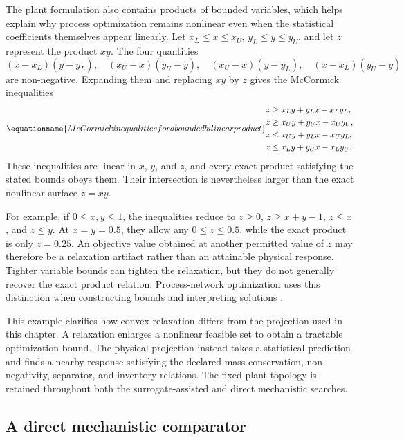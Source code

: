 The plant formulation also contains products of bounded variables, which helps explain why process optimization remains nonlinear even when the statistical coefficients themselves appear linearly. Let $x_L\leq x\leq x_U$, $y_L\leq y\leq y_U$, and let $z$ represent the product $xy$. The four quantities
\[
(x-x_L)(y-y_L),\quad (x_U-x)(y_U-y),\quad
(x_U-x)(y-y_L),\quad (x-x_L)(y_U-y)
\]
are non-negative. Expanding them and replacing $xy$ by $z$ gives the McCormick inequalities \citep{McCormick1976}
\begin{equation}
\equationname{McCormick inequalities for a bounded bilinear product}
\begin{aligned}
z&\geq x_Ly+y_Lx-x_Ly_L,\\
z&\geq x_Uy+y_Ux-x_Uy_U,\\
z&\leq x_Uy+y_Lx-x_Uy_L,\\
z&\leq x_Ly+y_Ux-x_Ly_U.
\end{aligned}
\label{eq:teaching_mccormick_relaxation}
\end{equation}
These inequalities are linear in $x$, $y$, and $z$, and every exact product satisfying the stated bounds obeys them. Their intersection is nevertheless larger than the exact nonlinear surface $z=xy$.

For example, if $0\leq x,y\leq1$, the inequalities reduce to $z\geq0$, $z\geq x+y-1$, $z\leq x$, and $z\leq y$. At $x=y=0.5$, they allow any $0\leq z\leq0.5$, while the exact product is only $z=0.25$. An objective value obtained at another permitted value of $z$ may therefore be a relaxation artifact rather than an attainable physical response. Tighter variable bounds can tighten the relaxation, but they do not generally recover the exact product relation. Process-network optimization uses this distinction when constructing bounds and interpreting solutions \citep{RubioCastro2013,YangNetwork2014}.

This example clarifies how convex relaxation differs from the projection used in this chapter. A relaxation enlarges a nonlinear feasible set to obtain a tractable optimization bound. The physical projection instead takes a statistical prediction and finds a nearby response satisfying the declared mass-conservation, non-negativity, separator, and inventory relations. The fixed plant topology is retained throughout both the surrogate-assisted and direct mechanistic searches.

\subsection{A direct mechanistic comparator}

